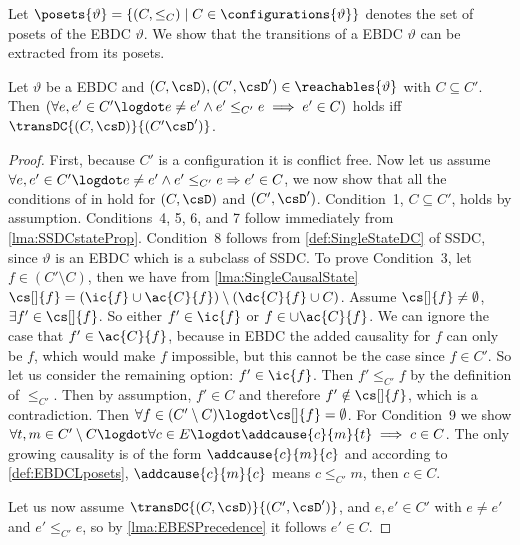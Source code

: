 \documentclass[runningheads,a4paper]{llncs}
\begin{document}
Let $\posets{\vartheta} = \{(C, \leq_C) \mid C \in \configurations{\vartheta}\}$
denotes the set of posets of the EBDC $\vartheta$. We show that the
transitions of a EBDC $\vartheta$ can be extracted from its posets.

\begin{theorem}
\label{thm:EBDCTrFromPosets}
Let $\vartheta$ be a EBDC and $(C,\csD), (C',\csD') \in \reachables{\vartheta}$
with $C\subseteq C'$.\\
Then
$\left(\forall e,e'\in C'\logdot e\neq e'\land e'\leq_{C'} e\implies e'\in
C \right)$ holds iff $\transDC{(C,\csD)}{(C'\csD')}$.
\end{theorem}

\begin{proof}
First, because $C'$ is a configuration it is conflict free. Now let us assume
$\forall e,e'\in C'\logdot e\neq e'\land  e'\leq_{C'} e\Rightarrow e'\in C$, we
now show that all the conditions of  in \cite{dynamicCausality15} hold
for $(C,\csD)$ and $(C',\csD')$. Condition~1,
$C\subseteq C'$, holds by assumption. Conditions~4,
5, 6, and
7 follow immediately from \lem\ref{lma:SSDCstateProp}. Condition~8 follows from 
\ref{def:SingleStateDC} of SSDC, since $ \vartheta $ is an EBDC 
which is a subclass of SSDC. To prove Condition~3, let
$f\in(C'\setminus C)$, then we have from \lem\ref{lma:SingleCausalState}
$\cs[]{f}=\left(\ic{f}\cup\ac{C}{f}\right)\setminus \left(\dc{C}{f}\cup C\right)$. 
Assume $\cs[]{f} \neq
\emptyset$, \ie $ \exists f'\in \cs[]{f}$. So either $f' \in \ic{f}$ or $f \in
\cup\ac{C}{f}$. We can ignore the case that $f' \in \ac{C}{f}$, because in EBDC the added
causality for $f$ can only be $f$, which would make $f$
impossible, but this cannot be the case since $f \in C'$.
So let us consider the remaining option: $f'\in \ic{f}$. Then $f'\leq_{C'}
f$ by the definition of $\leq_{C'}$. Then by assumption, $f'\in C$ and
therefore $f'\notin \cs[]{f}$, which is a contradiction. Then $\forall
f\in(C'\setminus C) \logdot \cs[]{f} = \emptyset$. For Condition~9 
we show $\forall t,m \in C'\setminus C\logdot\forall c\in E \logdot \addcause{c}{m}{t}\implies c\in C$. 
The only growing causality is of the form $\addcause{c}{m}{c}$ and according to 
\ref{def:EBDCLposets}, $\addcause{c}{m}{c}$ means $c\leq_{C'} m$,
then $c\in C$.

Let us now assume $\transDC{(C,\csD)}{(C',\csD')}$, and $e,e'\in C'$ with $e\neq
e'$ and $e'\leq_{C'} e$, so by \lem\ref{lma:EBESPrecedence} it follows $e'\in C$.
\end{proof}
\end{document}
